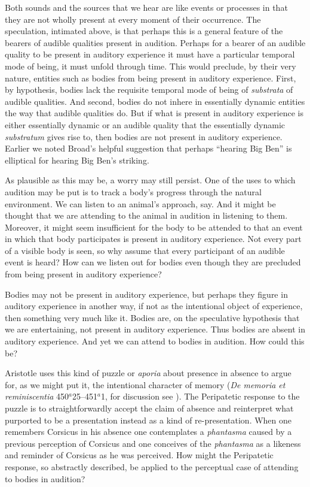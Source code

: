Both sounds and the sources that we hear are like events or processes in that they are not wholly present at every moment of their occurrence. The speculation, intimated above, is that perhaps this is a general feature of the bearers of audible qualities present in audition. Perhaps for a bearer of an audible quality to be present in auditory experience it must have a particular temporal mode of being, it must unfold through time. This would preclude, by their very nature, entities such as bodies from being present in auditory experience. First, by hypothesis, bodies lack the requisite temporal mode of being of \emph{substrata} of audible qualities. And second, bodies do not inhere in essentially dynamic entities the way that audible qualities do. But if what is present in auditory experience is either essentially dynamic or an audible quality that the essentially dynamic \emph{substratum} gives rise to, then bodies are not present in auditory experience. Earlier we noted Broad's helpful suggestion that perhaps ``hearing Big Ben'' is elliptical for hearing Big Ben's striking.

As plausible as this may be, a worry may still persist. One of the uses to which audition may be put is to track a body's progress through the natural environment. We can listen to an animal's approach, say. And it might be thought that we are attending to the animal in audition in listening to them. Moreover, it might seem insufficient for the body to be attended to that an event in which that body participates is present in auditory experience. Not every part of a visible body is seen, so why assume that every participant of an audible event is heard? How can we listen out for bodies even though they are precluded from being present in auditory experience? 

Bodies may not be present in auditory experience, but perhaps they figure in auditory experience in another way, if not as the intentional object of experience, then something very much like it. Bodies are, on the speculative hypothesis that we are entertaining, not present in auditory experience. Thus bodies are absent in auditory experience. And yet we can attend to bodies in audition. How could this be? 

Aristotle uses this kind of puzzle or \emph{aporia} about presence in absence to argue for, as we might put it, the intentional character of memory (\emph{De memoria et reminiscentia} 450\( ^{a} \)25--451\( ^{a} \)1, for discussion see \citealt{Sorabji:2004qa}). The Peripatetic response to the puzzle is to straightforwardly accept the claim of absence and reinterpret what purported to be a presentation instead as a kind of re-presentation. When one remembers Corsicus in his absence one contemplates a \emph{phantasma} caused by a previous perception of Corsicus and one conceives of the \emph{phantasma} as a likeness and reminder of Corsicus as he was perceived. How might the Peripatetic response, so abstractly described, be applied to the perceptual case of attending to bodies in audition? 

